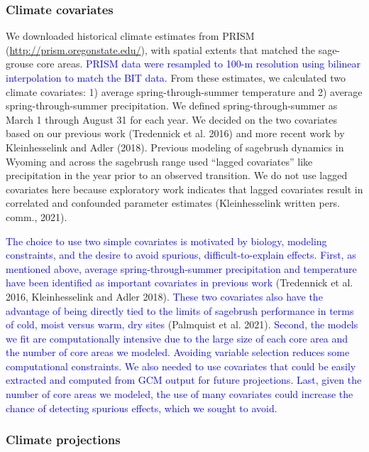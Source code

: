 \documentclass[
  12pt,
]{article}
\begin{document}
\hypertarget{climate-covariates}{%
\subsubsection{Climate covariates}\label{climate-covariates}}

We downloaded historical climate estimates from PRISM (\url{http://prism.oregonstate.edu/}), with spatial extents that matched the sage-grouse core areas.
\textcolor{blue}{PRISM data were resampled to 100-m resolution using bilinear interpolation to match the BIT data.}
From these estimates, we calculated two climate covariates: 1) average spring-through-summer temperature and 2) average spring-through-summer precipitation.
We defined spring-through-summer as March 1 through August 31 for each year.
We decided on the two covariates based on our previous work (Tredennick et al. 2016) and more recent work by Kleinhesselink and Adler (2018).
Previous modeling of sagebrush dynamics in Wyoming and across the sagebrush range used ``lagged covariates'' like precipitation in the year prior to an observed transition.
We do not use lagged covariates here because exploratory work indicates that lagged covariates result in correlated and confounded parameter estimates (Kleinhesselink written pers. comm., 2021).

\textcolor{blue}{The choice to use two simple covariates is motivated by biology, modeling constraints, and the desire to avoid spurious, difficult-to-explain effects.} \textcolor{blue}{First, as mentioned above, average spring-through-summer precipitation and temperature have been identified as important covariates in previous work} (Tredennick et al. 2016, Kleinhesselink and Adler 2018).
\textcolor{blue}{These two covariates also have the advantage of being directly tied to the limits of sagebrush performance in terms of cold, moist versus warm, dry sites} (Palmquist et al. 2021).
\textcolor{blue}{Second, the models we fit are computationally intensive due to the large size of each core area and the number of core areas we modeled.}
\textcolor{blue}{Avoiding variable selection reduces some computational constraints.}
\textcolor{blue}{We also needed to use covariates that could be easily extracted and computed from GCM output for future projections}.
\textcolor{blue}{Last, given the number of core areas we modeled, the use of many covariates could increase the chance of detecting spurious effects, which we sought to avoid.}

\hypertarget{climate-projections}{%
\subsubsection{Climate projections}\label{climate-projections}}
\end{document}
